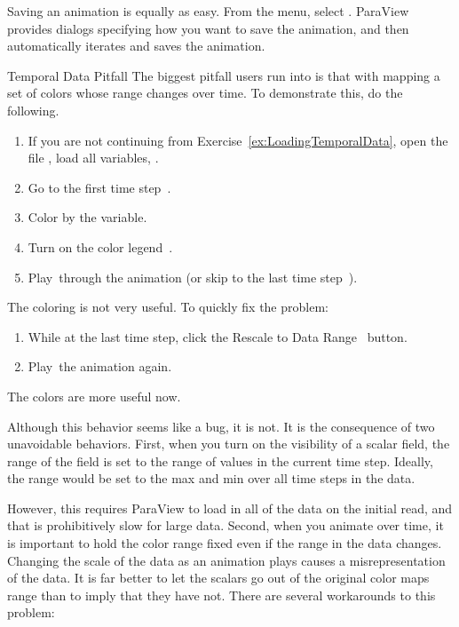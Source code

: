 Saving an animation is equally as easy.  From the menu, select 
\ra {}.  ParaView provides dialogs specifying how you
want to save the animation, and then automatically iterates and saves the
animation.

\begin{exercise}{Temporal Data Pitfall}
  \label{ex:TemporalDataPitfall}%
  The biggest pitfall users run into is that with mapping a set of colors
  whose range changes over time.  To demonstrate this, do the following.

  \begin{enumerate}
  \item If you are not continuing from
    Exercise~\ref{ex:LoadingTemporalData}, open the file ,
    load all variables, \apply.
  \item Go to the first time step~\vcrFirst.
  \item Color by the  variable.
  \item Turn on the color legend~.
  \item Play~\vcrPlay through the animation (or skip to the last time
    step~\vcrLast).
    \savecounter
  \end{enumerate}
  The coloring is not very useful.  To quickly fix the problem:
  \begin{enumerate}
    \restorecounter
  \item While at the last time step, click the Rescale to Data
    Range~ button.
  \item Play~\vcrPlay the animation again.
  \end{enumerate}

  The colors are more useful now.
\end{exercise}

Although this behavior seems like a bug, it is not.  It is the consequence
of two unavoidable behaviors.  First, when you turn on the visibility of a
scalar field, the range of the field is set to the range of values in the
current time step.  Ideally, the range would be set to the max and min over
all time steps in the data.

However, this requires ParaView to load
in all of the data on the initial read, and that is prohibitively
slow for large data.  Second, when you animate over time, it is important
to hold the color range fixed even if the range in the data changes.
Changing the scale of the data as an animation plays causes a
misrepresentation of the data.  It is far better to let the scalars go out
of the original color maps range than to imply that they have not.  There
are several workarounds to this problem:

